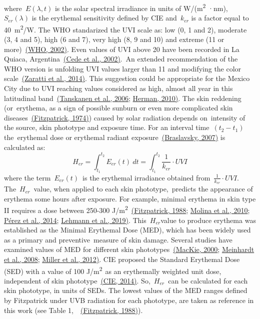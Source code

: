 \documentclass[10pt]{article}
\begin{document}
where\emph{~\(E\left(\lambda,t\right)\)} is the solar spectral irradiance in
units of W/(m\textsuperscript{2} ·nm),~\emph{~\(S_{er}\left(\lambda\right)\)} is the
erythemal sensitivity defined by CIE and~\(k_{er}\) is a factor
equal to 40~m\textsuperscript{2}/W. The WHO standarized the UVI scale
as: low (0, 1 and 2), moderate (3, 4 and 5), high (6 and 7), very high
(8, 9 and 10) and extreme (11 or more)~\hyperref[csl:24]{(WHO, 2002)}. Even values
of UVI above 20 have been recorded in La Quiaca,
Argentina~\hyperref[csl:25]{(Cede et al., 2002)}.~An extended recommendation of the WHO
version is unfolding UVI values larger than 11 and modifying the color
scale~\hyperref[csl:26]{(Zaratti et al., 2014)}. This suggestion could be appropriate for the
Mexico City due to UVI reaching values considered as high, almost all
year in this latitudinal band~\hyperref[csl:27]{(Tanskanen et al., 2006}; \hyperref[csl:28]{Herman, 2010)}. The skin reddening
(or~erythema, as a sign of possible sunburn or even more complicated
skin diseases~\hyperref[csl:22]{(Fitzpatrick, 1974)}) caused by solar radiation depends
on~intensity of the source, skin phototype and exposure time. For an
interval time~\((t_2-t_1)\) the~erythemal dose or erythemal radiant
exposure~\hyperref[csl:29]{(Braslavsky, 2007)} is calculated as:
\begin{equation}
H_{er}=\int_{t_{1}}^{t_{2}}{E_{er}(t)}\ dt=\int_{t_{1}}^{t_{2}}{\frac{1}{k_{er}}\cdot UVI}
\end{equation}
where the term~\(E_{er}(t)\)~is
the erythemal irradiance obtained from~\(\frac{1}{k_{er}}\cdot UVI\).
The~\(H_{er}\)~value, when applied to each skin
phototype,~predicts the appearance of erythema some hours after
exposure. For example, minimal erythema in skin type II requires a dose
between 250-300 J/m\textsuperscript{2}~\hyperref[csl:30]{(Fitzpatrick, 1988}; \hyperref[csl:4]{Molina et al., 2010}; \hyperref[csl:31]{Pérez et al., 2014}; \hyperref[csl:32]{Lehmann et al., 2019)}.
This~\(H_{er}\)value to produce erythema was established as the
Minimal Erythemal Dose (MED), which has been widely used as a primary
and preventive~measure of skin damage. Several studies have examined
values of MED for different skin phototypes~\hyperref[csl:33]{(MacKie, 2000}; \hyperref[csl:34]{Meinhardt et al., 2008}; \hyperref[csl:35]{Miller et al., 2012)}. CIE
proposed the Standard Erythemal Dose (SED) with a value of 100
J/m\textsuperscript{2~}as an erythemally weighted unit dose, independent
of skin phototype~\hyperref[csl:23]{(CIE, 2014)}. So,~\(H_{er}\)~can be
calculated for each skin phototype, in units of SEDs. The lowest values
of the MED ranges defined by Fitzpatrick under UVB radiation for each
phototype, are taken as reference in this work (see Table
1,~~\hyperref[csl:30]{(Fitzpatrick, 1988)}).
\end{document}
